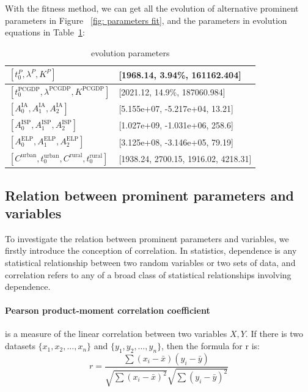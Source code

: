     With the fitness method, we can get all the evolution of alternative prominent parameters in Figure ~\ref{fig: parameters fit}, and the parameters in evolution equations in Table~\ref{tab: evolution par}:
    \begin{table}[!h]
      \centering
      \begin{tabular}{|l|l|}
      \hline
      $\left[t_0^P, \lambda^P,K^P\right]$ & [1968.14, 3.94\%, 161162.404] \\
      \hline
      $\left[t_0^\text{PCGDP}, \lambda^\text{PCGDP},K^\text{PCGDP}\right]$ & [2021.12, 14.9\%, 187060.984] \\
      \hline
      $\left[A_0^\text{IA},A_1^\text{IA},A_2^\text{IA}\right]$ & [5.155e+07, -5.217e+04, 13.21] \\
      \hline
      $\left[A_0^\text{ISP},A_1^\text{ISP},A_2^\text{ISP}\right]$ & [1.027e+09, -1.031e+06, 258.6] \\
      \hline
      $\left[A_0^\text{ELP},A_1^\text{ELP},A_2^\text{ELP}\right]$ & [3.125e+08, -3.146e+05, 79.19] \\
      \hline
      $\left[C^\text{urban},t_0^\text{urban},C^\text{rural},t_0^\text{rural}\right]$ & [1938.24, 2700.15, 1916.02, 4218.31] \\
      \hline
      \end{tabular}
      \caption{evolution parameters}
      \label{tab: evolution par}
    \end{table}


  \subsection{Relation between prominent parameters and variables}
    To investigate the relation between prominent parameters and variables, we firstly introduce the conception of  correlation. In statistics, dependence is any statistical relationship between two random variables or two sets of data, and correlation refers to any of a broad class of statistical relationships involving dependence.


    \paragraph{Pearson product-moment correlation coefficient}\cite{Pearson} is a measure of the linear correlation between two variables $X, Y$. If there is two datasets $\{x_1,x_2,\dots, x_n\}$ and $\{y_1,y_2,\dots, y_n\}$, then the formula for r is\cite{pearsonr}:
    $$
    r = \frac{\sum{(x_i-\bar{x})(y_i-\bar{y})}}{\sqrt{\sum{(x_i-\bar{x})^2}}\sqrt{\sum{(y_i-\bar{y})^2}}}
    $$

